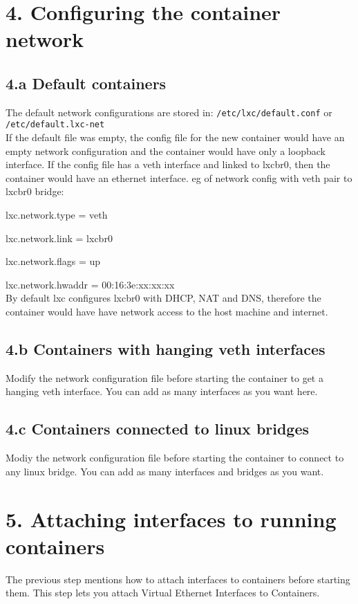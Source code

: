 \documentclass{report}
\begin{document}
\section*{4. Configuring the container network}
		
\subsection*{4.a Default containers}
The default network configurations are stored in:
\texttt{/etc/lxc/default.conf} or \texttt{/etc/default.lxc-net} \\
If the default file was empty, the config file for the new container would have an empty network configuration and the container would have only a loopback interface. If the config file has a veth interface and linked to lxcbr0, then the container would have an ethernet interface. eg of network config with veth pair to lxcbr0 bridge:  

lxc.network.type = veth

lxc.network.link = lxcbr0

lxc.network.flags = up

lxc.network.hwaddr = 00:16:3e:xx:xx:xx \\
By default lxc configures lxcbr0 with DHCP, NAT and DNS, therefore the container would have have network access to the host machine and internet.

\subsection*{4.b Containers with hanging veth interfaces}
		Modify the  network configuration file before starting the container to get a hanging veth interface. You can add as many interfaces as you want here.

\subsection*{4.c Containers connected to linux bridges}
		Modiy the network configuration file before starting the container to connect to any linux bridge. You can add as many interfaces and bridges as you want.

\section*{5. Attaching interfaces to running containers}
		The previous step mentions how to attach interfaces to containers before starting them. This step lets you attach Virtual Ethernet Interfaces to Containers.
\end{document}
